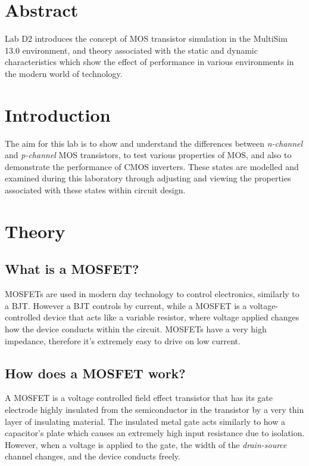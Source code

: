\documentclass[12pt]{article}
\begin{document}
\tableofcontents
\thispagestyle{empty}
\cleardoublepage
\setcounter{page}{1}

\section{Abstract}
Lab D2 introduces the concept of MOS transistor simulation in the MultiSim 13.0 environment, and theory associated with the static and dynamic characteristics which show the effect of performance in various environments in the modern world of technology.
\section{Introduction}
The aim for this lab is to show and understand the differences between \emph{n-channel} and \emph{p-channel} MOS transistors, to test various properties of MOS, and also to demonstrate the performance of CMOS inverters. These states are modelled and examined during this laboratory through adjusting and viewing the properties associated with these states within circuit design.
\section{Theory}
\subsection{What is a MOSFET?}
MOSFETs are used in modern day technology to control electronics, similarly to a BJT. However a BJT controls by current, while a MOSFET is a voltage-controlled device that acts like a variable resistor, where voltage applied changes how the device conducts within the circuit. MOSFETs have a very high impedance, therefore it's extremely easy to drive on low current.
\subsection{How does a MOSFET work?}
A MOSFET is a voltage controlled field effect transistor that has its gate electrode highly insulated from the semiconductor in the transistor by a very thin layer of insulating material. The insulated metal gate acts similarly to how a capacitor's plate which causes an extremely high input resistance due to isolation. However, when a voltage is applied to the gate, the width of the \emph{drain-source} channel changes, and the device conducts freely.
\end{document}

